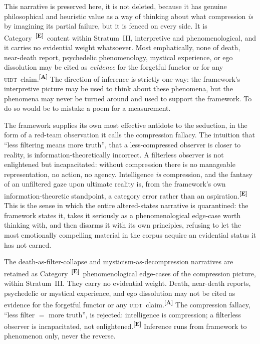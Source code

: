 \documentclass[12pt,a4paper,twoside]{article}
\theoremstyle{plain}
\theoremstyle{definition}
\theoremstyle{remark}
\newcommand{\UIDT}{\textsc{uidt}}
\newcommand{\catmark}[1]{\textsuperscript{\textsf{\textbf{[#1]}}}}
\begin{document}
This narrative is preserved here, it is not deleted, because it has genuine philosophical and heuristic value as a way of thinking about what compression \emph{is} by imagining its partial failure, but it is fenced on every side. It is Category~\catmark{E}\ content within Stratum~III, interpretive and phenomenological, and it carries no evidential weight whatsoever. Most emphatically, none of death, near-death report, psychedelic phenomenology, mystical experience, or ego dissolution may be cited as \emph{evidence} for the forgetful functor or for any \UIDT\ claim.\catmark{A} The direction of inference is strictly one-way: the framework's interpretive picture may be used to think about these phenomena, but the phenomena may never be turned around and used to support the framework. To do so would be to mistake a poem for a measurement.

The framework supplies its own most effective antidote to the seduction, in the form of a red-team observation it calls the compression fallacy. The intuition that ``less filtering means more truth'', that a less-compressed observer is closer to reality, is information-theoretically incorrect. A filterless observer is not enlightened but incapacitated: without compression there is no manageable representation, no action, no agency. Intelligence \emph{is} compression, and the fantasy of an unfiltered gaze upon ultimate reality is, from the framework's own information-theoretic standpoint, a category error rather than an aspiration.\catmark{E} This is the sense in which the entire altered-states narrative is quarantined: the framework states it, takes it seriously as a phenomenological edge-case worth thinking with, and then disarms it with its own principles, refusing to let the most emotionally compelling material in the corpus acquire an evidential status it has not earned.

\begin{governancebox}
The death-as-filter-collapse and mysticism-as-decompression narratives are retained as Category~\catmark{E}\ phenomenological edge-cases of the compression picture, within Stratum~III. They carry no evidential weight. Death, near-death reports, psychedelic or mystical experience, and ego dissolution may not be cited as evidence for the forgetful functor or any \UIDT\ claim.\catmark{A} The compression fallacy, ``less filter $=$ more truth'', is rejected: intelligence is compression; a filterless observer is incapacitated, not enlightened.\catmark{E} Inference runs from framework to phenomenon only, never the reverse.
\end{governancebox}
\end{document}
